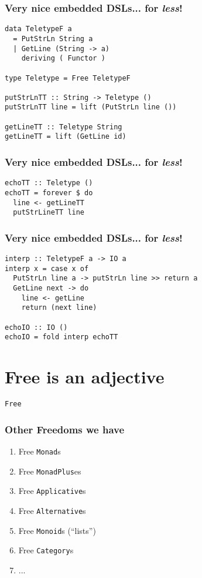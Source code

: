 \documentclass[pdf]{beamer}
\begin{document}
\begin{frame}[fragile]
  \frametitle{Very nice embedded DSLs... for \textit{less}!}
\begin{lstlisting}
data TeletypeF a 
  = PutStrLn String a 
  | GetLine (String -> a)
    deriving ( Functor )
                     
type Teletype = Free TeletypeF

putStrLnTT :: String -> Teletype ()
putStrLnTT line = lift (PutStrLn line ())

getLineTT :: Teletype String
getLineTT = lift (GetLine id)
\end{lstlisting}
\end{frame}

\begin{frame}[fragile]
  \frametitle{Very nice embedded DSLs... for \textit{less}!}
\begin{lstlisting}
echoTT :: Teletype ()
echoTT = forever $ do
  line <- getLineTT
  putStrLineTT line
\end{lstlisting}
\end{frame}

\begin{frame}[fragile]
  \frametitle{Very nice embedded DSLs... for \textit{less}!}
\begin{lstlisting}
interp :: TeletypeF a -> IO a
interp x = case x of
  PutStrLn line a -> putStrLn line >> return a
  GetLine next -> do
    line <- getLine
    return (next line)

echoIO :: IO ()
echoIO = fold interp echoTT
\end{lstlisting}
\end{frame}

\section{Free is an adjective}

\begin{frame}
  \begin{center}
    \texttt{Free}
  \end{center}
\end{frame}

\begin{frame}
  \frametitle{Other Freedoms we have}
  \begin{enumerate}
  \pause\item Free \texttt{Monad}s
  \pause\item Free \texttt{MonadPlus}es
  \pause\item Free \texttt{Applicative}s
  \pause\item Free \texttt{Alternative}s
  \pause\item Free \texttt{Monoid}s (``lists'')
  \pause\item Free \texttt{Category}s
  \pause\item ...
  \end{enumerate}
\end{frame}
\end{document}
